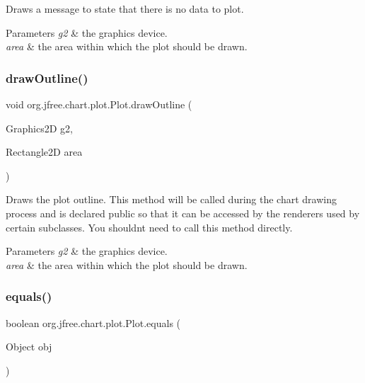 Draws a message to state that there is no data to plot.


\begin{DoxyParams}{Parameters}
{\em g2} & the graphics device. \\
\hline
{\em area} & the area within which the plot should be drawn. \\
\hline
\end{DoxyParams}
\mbox{\label{classorg_1_1jfree_1_1chart_1_1plot_1_1_plot_aef03ab51bf529dd93127eb5df5e6d582}} 
\subsubsection{\texorpdfstring{draw\+Outline()}{drawOutline()}}
{\footnotesize\ttfamily void org.\+jfree.\+chart.\+plot.\+Plot.\+draw\+Outline (\begin{DoxyParamCaption}\item[{Graphics2D}]{g2,  }\item[{Rectangle2D}]{area }\end{DoxyParamCaption})}

Draws the plot outline. This method will be called during the chart drawing process and is declared public so that it can be accessed by the renderers used by certain subclasses. You shouldn\textquotesingle{}t need to call this method directly.


\begin{DoxyParams}{Parameters}
{\em g2} & the graphics device. \\
\hline
{\em area} & the area within which the plot should be drawn. \\
\hline
\end{DoxyParams}
\mbox{\label{classorg_1_1jfree_1_1chart_1_1plot_1_1_plot_a37e08b21e9d8f993385a73df0c87c2ea}} 
\subsubsection{\texorpdfstring{equals()}{equals()}}
{\footnotesize\ttfamily boolean org.\+jfree.\+chart.\+plot.\+Plot.\+equals (\begin{DoxyParamCaption}\item[{Object}]{obj }\end{DoxyParamCaption})}

